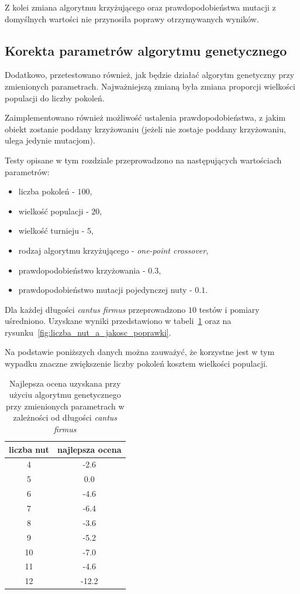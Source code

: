 \documentclass{article}
\begin{document}
Z kolei zmiana algorytmu krzyżującego oraz prawdopodobieństwa mutacji z domyślnych wartości nie przynosiła poprawy otrzymywanych wyników.

\subsection{Korekta parametrów algorytmu genetycznego}

Dodatkowo, przetestowano również, jak będzie działać algorytm genetyczny przy zmienionych parametrach. Najważniejszą zmianą była zmiana proporcji wielkości populacji do liczby pokoleń.

Zaimplementowano również możliwość ustalenia prawdopodobieństwa, z jakim obiekt zostanie poddany krzyżowaniu (jeżeli nie zostaje poddany krzyżowaniu, ulega jedynie mutacjom).

Testy opisane w tym rozdziale przeprowadzono na następujących wartościach parametrów:
\begin{itemize}
\item liczba pokoleń - $100$,
\item wielkość populacji - $20$,
\item wielkość turnieju - $5$,
\item rodzaj algorytmu krzyżującego - \emph{one-point crossover},
\item prawdopodobieństwo krzyżowania - $0.3$,
\item prawdopodobieństwo mutacji pojedynczej nuty - $0.1$.
\end{itemize}

Dla każdej długości \emph{cantus firmus} przeprowadzono $10$ testów i pomiary uśredniono. Uzyskane wyniki przedstawiono w tabeli~\ref{tab:wyniki2} oraz na rysunku~\ref{fig:liczba_nut_a_jakosc_poprawki}.

Na podstawie poniższych danych można zauważyć, że korzystne jest w tym wypadku znaczne zwiększenie liczby pokoleń kosztem wielkości populacji.

\begin{table}
\begin{center}
  \begin{tabular}{ | c | c | } 
    \hline
	liczba nut & najlepsza ocena \\ \hline \hline
	4 & -2.6 \\ \hline
	5 & 0.0 \\ \hline
	6 & -4.6 \\ \hline
	7 & -6.4 \\ \hline
	8 & -3.6 \\ \hline
	9 & -5.2 \\ \hline
	10 & -7.0 \\ \hline
	11 & -4.6 \\ \hline
	12 & -12.2 \\ \hline
  \end{tabular}
  \caption{Najlepsza ocena uzyskana przy użyciu algorytmu genetycznego przy zmienionych parametrach w zależności od długości \emph{cantus firmus}}
  \label{tab:wyniki2}
  \end{center}
\end{table}
\end{document}
